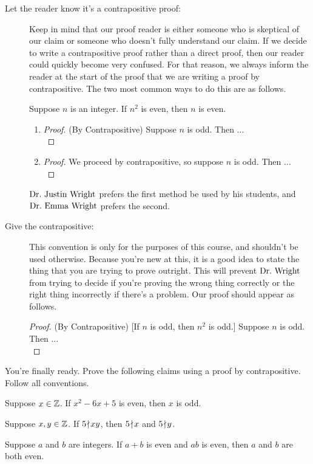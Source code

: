 \begin{description}
\item[Let the reader know it's a contrapositive proof:]  Keep in mind that our proof reader is either someone who is skeptical of our claim or someone who doesn't fully understand our claim.  If we decide to write a contrapositive proof rather than a direct proof, then our reader could quickly become very confused.  For that reason, we always inform the reader at the start of the proof that we are writing a proof by contrapositive.  The two most common ways to do this are as follows.
	\begin{claim}  Suppose $n$ is an integer.  If $n^2$ is even, then $n$ is even.
	\end{claim}
		\begin{enumerate}[label=(\roman*)]
		\item \begin{proof} (By Contrapositive) Suppose $n$ is odd.  Then $\ldots$\\
		\end{proof}
		\item \begin{proof} We proceed by contrapositive, so suppose $n$ is odd.  Then $\ldots$\\
		\end{proof}
		\end{enumerate}
	$\text{Dr.~Justin Wright}$ prefers the first method be used by his students, and $\text{Dr.~Emma Wright}$ prefers the second.
	
\item[Give the contrapositive:]  This convention is only for the purposes of this course, and shouldn't be used otherwise.  Because you're new at this, it is a good idea to state the thing that you are trying to prove outright.  This will prevent $\text{Dr.~Wright}$ from trying to decide if you're proving the wrong thing correctly or the right thing incorrectly if there's a problem.  Our proof should appear as follows.
	\begin{proof}(By Contrapositive) [If $n$ is odd, then $n^2$ is odd.] Suppose $n$ is odd.  Then $\ldots$\\
	\end{proof}
\end{description}
\begin{question}[resume]
\item You're finally ready.  Prove the following claims using a proof by contrapositive.  Follow all conventions.

\begin{claim}  Suppose $x \in \mathbb{Z}$.  If $x^2-6x+5$ is even, then $x$ is odd.
\end{claim}
\vspace{3in}
\begin{claim}  Suppose $x,y \in \mathbb{Z}$.  If $5 \! \nmid \! xy$, then $5 \! \nmid \! x$ and $5 \! \nmid \! y$.
\end{claim}
\newpage
\begin{claim}  Suppose $a$ and $b$ are integers.  If $a+b$ is even and $ab$ is even, then $a$ and $b$ are both even.
\end{claim}
\vspace{5in}
\end{question}

